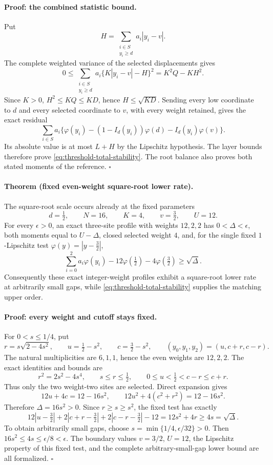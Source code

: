\paragraph{Proof: the combined statistic bound.}
Put
\[
 H=\sum_{\substack{i\in S\\y_i\ge d}}a_i|y_i-v|.
\]
The complete weighted variance of the selected displacements gives
\[
 0\le\sum_{\substack{i\in S\\y_i\ge d}}
        a_i\{K|y_i-v|-H\}^2=K^2Q-KH^2.
\]
Since \(K>0\), \(H^2\le KQ\le KD\), hence \(H\le\sqrt{KD}\).
Sending every low coordinate to \(d\) and every selected coordinate to
\(v\), with every weight retained, gives the exact residual
\[
 \sum_{i\in S}a_i\{\varphi(y_i)-(1-I_d(y_i))\varphi(d)
                                      -I_d(y_i)\varphi(v)\}.
\]
Its absolute value is at most \(L+H\) by the Lipschitz hypothesis.
The layer bounds therefore prove
\eqref{eq:threshold-total-stability}.
The root balance also proves both stated moments of the reference.
\hfill\(\square\)

\paragraph{Theorem (fixed even-weight square-root lower rate).}
The square-root scale occurs already at the fixed parameters
\[
 d=\tfrac12,\qquad N=16,\qquad K=4,\qquad v=\tfrac32,\qquad U=12.
\]
For every \(\epsilon>0\), an exact three-site profile with weights
\(12,2,2\) has \(0<\Delta<\epsilon\), both moments equal to \(U-\Delta\),
closed selected weight \(4\), and, for the single fixed \(1\)-Lipschitz
test \(\varphi(y)=|y-\tfrac32|\),
\[
 \sum_{i=0}^2a_i\varphi(y_i)-12\varphi(\tfrac12)-4\varphi(\tfrac32)
 \ge\sqrt{\Delta}.
\]
Consequently these exact integer-weight profiles exhibit a square-root
lower rate at arbitrarily small gaps, while
\eqref{eq:threshold-total-stability} supplies the matching upper order.

\paragraph{Proof: every weight and cutoff stays fixed.}
For \(0<s\le1/4\), put
\[
 r=s\sqrt{2-4s^2},\qquad
 u=\tfrac12-s^2,\qquad c=\tfrac32-s^2,
 \qquad (y_0,y_1,y_2)=(u,c+r,c-r).
\]
The natural multiplicities are \(6,1,1\), hence the even weights are
\(12,2,2\).  The exact identities and bounds are
\[
 r^2=2s^2-4s^4,\qquad s\le r\le\tfrac12,\qquad
 0\le u<\tfrac12<c-r\le c+r.
\]
Thus only the two weight-two sites are selected.  Direct expansion gives
\[
 12u+4c=12-16s^2,\qquad
 12u^2+4(c^2+r^2)=12-16s^2.
\]
Therefore \(\Delta=16s^2>0\).  Since \(r\ge s\ge s^2\), the fixed test
has exactly
\[
 12|u-\tfrac32|+2|c+r-\tfrac32|+2|c-r-\tfrac32|-12
 =12s^2+4r\ge4s=\sqrt{\Delta}.
\]
To obtain arbitrarily small gaps, choose
\(s=\min\{1/4,\epsilon/32\}>0\).  Then
\(16s^2\le4s\le\epsilon/8<\epsilon\).
The boundary values \(v=3/2\), \(U=12\), the Lipschitz property of this
fixed test, and the complete arbitrary-small-gap lower bound are all
formalized.
\hfill\(\square\)

